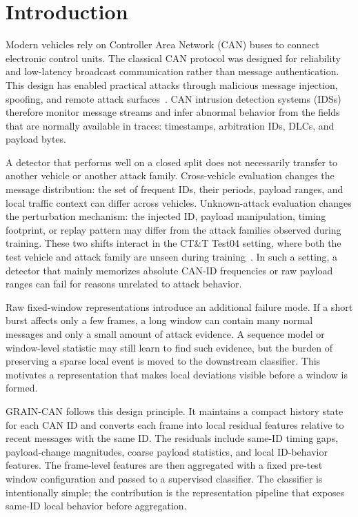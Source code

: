 \documentclass[runningheads]{llncs}
\newcommand{\method}{GRAIN-CAN}
\begin{document}
\section{Introduction}
Modern vehicles rely on Controller Area Network (CAN) buses to connect electronic control units. The classical CAN protocol was designed for reliability and low-latency broadcast communication rather than message authentication. This design has enabled practical attacks through malicious message injection, spoofing, and remote attack surfaces~\cite{koscher2010experimental,checkoway2011comprehensive,miller2015remote}. CAN intrusion detection systems (IDSs) therefore monitor message streams and infer abnormal behavior from the fields that are normally available in traces: timestamps, arbitration IDs, DLCs, and payload bytes.

A detector that performs well on a closed split does not necessarily transfer to another vehicle or another attack family. Cross-vehicle evaluation changes the message distribution: the set of frequent IDs, their periods, payload ranges, and local traffic context can differ across vehicles. Unknown-attack evaluation changes the perturbation mechanism: the injected ID, payload manipulation, timing footprint, or replay pattern may differ from the attack families observed during training. These two shifts interact in the CT\&T Test04 setting, where both the test vehicle and attack family are unseen during training~\cite{lampe2024ctt}. In such a setting, a detector that mainly memorizes absolute CAN-ID frequencies or raw payload ranges can fail for reasons unrelated to attack behavior.

Raw fixed-window representations introduce an additional failure mode. If a short burst affects only a few frames, a long window can contain many normal messages and only a small amount of attack evidence. A sequence model or window-level statistic may still learn to find such evidence, but the burden of preserving a sparse local event is moved to the downstream classifier. This motivates a representation that makes local deviations visible before a window is formed.

\method{} follows this design principle. It maintains a compact history state for each CAN ID and converts each frame into local residual features relative to recent messages with the same ID. The residuals include same-ID timing gaps, payload-change magnitudes, coarse payload statistics, and local ID-behavior features. The frame-level features are then aggregated with a fixed pre-test window configuration and passed to a supervised classifier. The classifier is intentionally simple; the contribution is the representation pipeline that exposes same-ID local behavior before aggregation.
\end{document}
